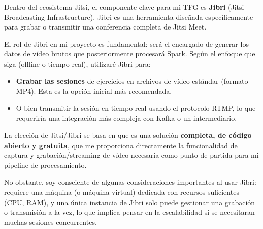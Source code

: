 Dentro del ecosistema Jitsi, el componente clave para mi TFG es \textbf{Jibri} (Jitsi Broadcasting Infrastructure). Jibri es una herramienta diseñada específicamente para grabar o transmitir una conferencia completa de Jitsi Meet.

El rol de Jibri en mi proyecto es fundamental: será el encargado de generar los datos de vídeo brutos que posteriormente procesará Spark. Según el enfoque que siga (offline o tiempo real), utilizaré Jibri para:
\begin{itemize}
    \item \textbf{Grabar las sesiones} de ejercicios en archivos de vídeo estándar (formato MP4). Esta es la opción inicial más recomendada.
    \item O bien transmitir la sesión en tiempo real usando el protocolo RTMP, lo que requeriría una integración más compleja con Kafka o un intermediario.
\end{itemize}

La elección de Jitsi/Jibri se basa en que es una solución \textbf{completa, de código abierto y gratuita}, que me proporciona directamente la funcionalidad de captura y grabación/streaming de vídeo necesaria como punto de partida para mi pipeline de procesamiento.

No obstante, soy consciente de algunas consideraciones importantes al usar Jibri: requiere una máquina (o máquina virtual) dedicada con recursos suficientes (CPU, RAM), y una única instancia de Jibri solo puede gestionar una grabación o transmisión a la vez, lo que implica pensar en la escalabilidad si se necesitaran muchas sesiones concurrentes.
